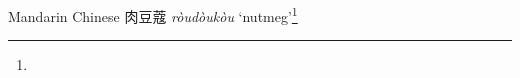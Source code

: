 \begin{etymology}\label{ety:roudoukou}
Mandarin Chinese {肉豆蔻} \textit{ròudòukòu} `nutmeg'\footnote{}
\end{etymology}
